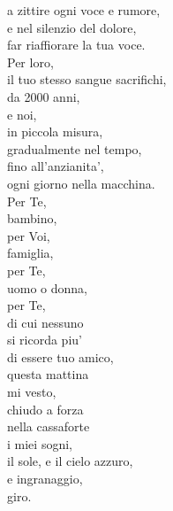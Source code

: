\begin{haiku}
a zittire ogni voce e rumore,\\
e nel silenzio del dolore,\\
far riaffiorare la tua voce.\\
Per loro,\\
il tuo stesso sangue sacrifichi, \\
da 2000 anni,\\
e noi,\\
in piccola misura,\\
gradualmente nel tempo,\\
fino all'anzianita',\\
ogni giorno nella macchina.\\
Per Te,\\
bambino,\\
per Voi,\\
famiglia,\\
per Te,\\
uomo o donna,\\
per Te,\\
di cui nessuno\\
si ricorda piu'\\
di essere tuo amico,\\
questa mattina\\
mi vesto,\\
chiudo a forza\\
nella cassaforte\\
i miei sogni,\\
il sole, e il cielo azzuro,\\
e ingranaggio,\\
giro.\\
\end{haiku}
